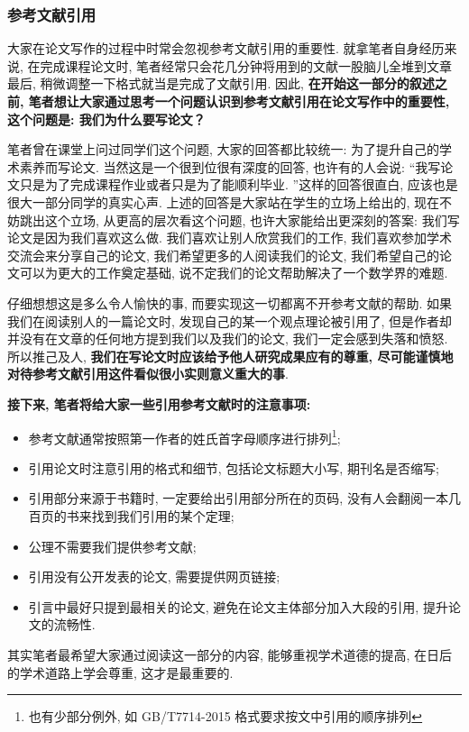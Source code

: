 \documentclass{booki}
\begin{document}
\subsubsection{参考文献引用}
大家在论文写作的过程中时常会忽视参考文献引用的重要性. 就拿笔者自身经历来说, 在完成课程论文时, 笔者经常只会花几分钟将用到的文献一股脑儿全堆到文章最后, 稍微调整一下格式就当是完成了文献引用. 因此, \textbf{在开始这一部分的叙述之前, 笔者想让大家通过思考一个问题认识到参考文献引用在论文写作中的重要性, 这个问题是: 我们为什么要写论文？}\par
笔者曾在课堂上问过同学们这个问题, 大家的回答都比较统一: 为了提升自己的学术素养而写论文. 当然这是一个很到位很有深度的回答, 也许有的人会说: {``}我写论文只是为了完成课程作业或者只是为了能顺利毕业. ''这样的回答很直白, 应该也是很大一部分同学的真实心声. 上述的回答是大家站在学生的立场上给出的, 现在不妨跳出这个立场, 从更高的层次看这个问题, 也许大家能给出更深刻的答案: 我们写论文是因为我们喜欢这么做. 我们喜欢让别人欣赏我们的工作, 我们喜欢参加学术交流会来分享自己的论文, 我们希望更多的人阅读我们的论文, 我们希望自己的论文可以为更大的工作奠定基础, 说不定我们的论文帮助解决了一个数学界的难题. \par
仔细想想这是多么令人愉快的事, 而要实现这一切都离不开参考文献的帮助. 如果我们在阅读别人的一篇论文时, 发现自己的某一个观点理论被引用了, 但是作者却并没有在文章的任何地方提到我们以及我们的论文, 我们一定会感到失落和愤怒. 所以推己及人, \textbf{我们在写论文时应该给予他人研究成果应有的尊重, 尽可能谨慎地对待参考文献引用这件看似很小实则意义重大的事}. \par
{\textbf{接下来, 笔者将给大家一些引用参考文献时的注意事项:}}
\begin{itemize}
    \item {参考文献通常按照第一作者的姓氏首字母顺序进行排列\footnote{也有少部分例外, 如 GB/T7714-2015 格式要求按文中引用的顺序排列}}{;}
    \item 引用论文时注意引用的格式和细节, 包括论文标题大小写, 期刊名是否缩写{;}
    \item 引用部分来源于书籍时, 一定要给出引用部分所在的页码, 没有人会翻阅一本几百页的书来找到我们引用的某个定理{;}
    \item 公理不需要我们提供参考文献{;}
    \item 引用没有公开发表的论文, 需要提供网页链接{;}
    \item 引言中最好只提到最相关的论文, 避免在论文主体部分加入大段的引用, 提升论文的流畅性{.}
\end{itemize}
\par
其实笔者最希望大家通过阅读这一部分的内容, 能够重视学术道德的提高, 在日后的学术道路上学会尊重, 这才是最重要的.
\end{document}
